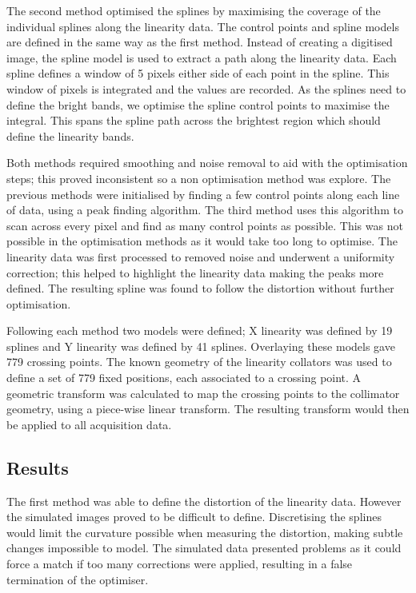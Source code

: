 The second method optimised the splines by maximising the coverage of the individual splines along the linearity data. The control points and spline models are defined in the same way as the first method. Instead of creating a digitised image, the spline model is used to extract a path along the linearity data. Each spline defines a window of 5 pixels either side of each point in the spline. This window of pixels is integrated and the values are recorded. As the splines need to define the bright bands, we optimise the spline control points to maximise the integral. This spans the spline path across  the brightest region which should define the linearity bands. 

Both methods required smoothing and noise removal to aid with the optimisation steps; this proved inconsistent so a non optimisation method was explore. The previous methods were initialised by finding a few control points along each line of data, using a peak finding algorithm. The third method uses this algorithm to scan across every pixel and find as many control points as possible. This was not possible in the optimisation methods as it would take too long to optimise. The linearity data was first processed to removed noise and underwent a uniformity correction; this helped to highlight the linearity data making the peaks more defined. The resulting spline was found to follow the distortion without further optimisation. 

Following each method two models were defined; X linearity was defined by 19 splines and Y linearity was defined by 41 splines. Overlaying these models gave 779 crossing points. The known geometry of the linearity collators was used to define a set of 779 fixed positions, each associated to a crossing point. A geometric transform was calculated to map the crossing points to the collimator geometry, using a piece-wise linear transform. The resulting transform would then be applied to all acquisition data.

\subsection{Results}
The first method was able to define the distortion of the linearity data. However the simulated images proved to be difficult to define. Discretising the splines would limit the curvature possible when measuring the distortion, making subtle changes impossible to model. The simulated data presented problems as it could force a match if too many corrections were applied, resulting in a false termination of the optimiser.

